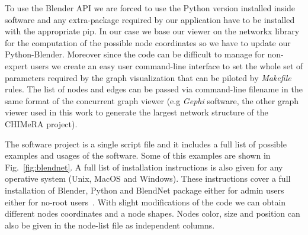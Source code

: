 \documentclass{standalone}
\begin{document}
To use the Blender API we are forced to use the Python version installed inside software and any extra-package required by our application have to be installed with the appropriate \textsf{pip}.
In our case we base our viewer on the \textsf{networkx} library for the computation of the possible node coordinates so we have to update our Python-Blender.
Moreover since the code can be difficult to manage for non-expert users we create an easy user command-line interface to set the whole set of parameters required by the graph visualization that can be piloted by \emph{Makefile} rules.
The list of nodes and edges can be passed via command-line filename in the same format of the concurrent graph viewer (e.g \emph{Gephi} software, the other graph viewer used in this work to generate the largest network structure of the CHIMeRA project).

The software project is a single script file and it includes a full list of possible examples and usages of the software.
Some of this examples are shown in Fig.~\ref{fig:blendnet}.
A full list of installation instructions is also given for any operative system (Unix, MacOS and Windows).
These instructions cover a full installation of Blender, Python and BlendNet package either for admin users either for no-root users~\cite{Shut}.
With slight modifications of the code we can obtain different nodes coordinates and a node shapes.
Nodes color, size and position can also be given in the node-list file as independent columns.
\end{document}
